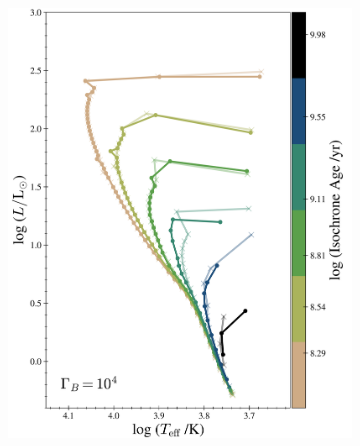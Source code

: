 \documentclass[useAMS,usenatbib]{mnras}
\providecommand{\DIFaddend}{} %
\providecommand{\DIFaddbeginFL}{} %
\providecommand{\DIFdelbeginFL}{} %
\providecommand{\DIFdelendFL}{} %
\newcommand{\DIFscaledelfig}{0.5}
\newlength{\DIFdelgraphicswidth} %
\newlength{\DIFdelgraphicsheight} %
\newcommand{\DIFaddincludegraphics}[2][]{{\color{blue}\fbox{\DIFOincludegraphics[#1]{#2}}}} %
\newcommand{\DIFdelincludegraphics}[2][]{%
\sbox{\DIFdelgraphicsbox}{\DIFOincludegraphics[#1]{#2}}%
\settoboxwidth{\DIFdelgraphicswidth}{\DIFdelgraphicsbox} %
\settoboxtotalheight{\DIFdelgraphicsheight}{\DIFdelgraphicsbox} %
\scalebox{\DIFscaledelfig}{%
\parbox[b]{\DIFdelgraphicswidth}{\usebox{\DIFdelgraphicsbox}\\[-\baselineskip] \rule{\DIFdelgraphicswidth}{0em}}\llap{\resizebox{\DIFdelgraphicswidth}{\DIFdelgraphicsheight}{%
\setlength{\unitlength}{\DIFdelgraphicswidth}%
\begin{picture}(1,1)%
\thicklines\linethickness{2pt} %
{\color[rgb]{1,0,0}\put(0,0){\framebox(1,1){}}}%
{\color[rgb]{1,0,0}\put(0,0){\line( 1,1){1}}}%
{\color[rgb]{1,0,0}\put(0,1){\line(1,-1){1}}}%
\end{picture}%
}\hspace*{3pt}}} %
} %
\DeclareRobustCommand{\DIFaddend}{\DIFOaddend \let\includegraphics\DIFOincludegraphics} %
\DeclareRobustCommand{\DIFaddbeginFL}{\DIFOaddbeginFL \let\includegraphics\DIFaddincludegraphics} %
\DeclareRobustCommand{\DIFdelbeginFL}{\DIFOdelbeginFL \let\includegraphics\DIFdelincludegraphics} %
\DeclareRobustCommand{\DIFdelendFL}{\DIFOaddendFL \let\includegraphics\DIFOincludegraphics} %
\begin{document}
\DIFaddend %
\begin{figure}
\centering
   \DIFdelbeginFL %
\DIFdelendFL \DIFaddbeginFL \begin{subfigure}{0.49\linewidth} \centering
     \includegraphics[scale=0.4]{plots/isos_cb4.png}
   \end{subfigure}
   \begin{subfigure}{0.49\linewidth} \centering

\end{subfigure}
\end{figure}
\end{document}
